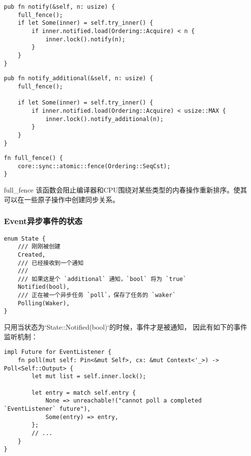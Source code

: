 \begin{lstlisting}[caption = 通知一定数量的监听者]
pub fn notify(&self, n: usize) {
    full_fence();
    if let Some(inner) = self.try_inner() {
        if inner.notified.load(Ordering::Acquire) < n {
            inner.lock().notify(n);
        }
    }
}
\end{lstlisting}

\begin{lstlisting}[caption = 通知一定数量没有被通知的监听者]
pub fn notify_additional(&self, n: usize) {
    full_fence();

    if let Some(inner) = self.try_inner() {
        if inner.notified.load(Ordering::Acquire) < usize::MAX {
            inner.lock().notify_additional(n);
        }
    }
}
\end{lstlisting}

\begin{lstlisting}[caption=full\_fence]
fn full_fence() {
    core::sync::atomic::fence(Ordering::SeqCst);
}
\end{lstlisting}

full\_fence 该函数会阻止编译器和CPU围绕对某些类型的内春操作重新排序。使其可以在一些原子操作中创建同步关系。

\subsubsection{Event异步事件的状态}
\begin{lstlisting}[caption=Event的状态]
enum State {
    /// 刚刚被创建
    Created,
    /// 已经接收到一个通知
    ///
    /// 如果这是个 `additional` 通知，`bool` 将为 `true`
    Notified(bool),
    /// 正在被一个异步任务 `poll`，保存了任务的 `waker`
    Polling(Waker),
}
\end{lstlisting}

只用当状态为`State::Notified(bool)`的时候，事件才是被通知， 因此有如下的事件监听机制：

\begin{lstlisting}[caption=Event的事件获取并判断事件是否完成]
impl Future for EventListener {
    fn poll(mut self: Pin<&mut Self>, cx: &mut Context<'_>) -> Poll<Self::Output> {
        let mut list = self.inner.lock();

        let entry = match self.entry {
            None => unreachable!("cannot poll a completed `EventListener` future"),
            Some(entry) => entry,
        };
        // ...
    }
}
\end{lstlisting}


